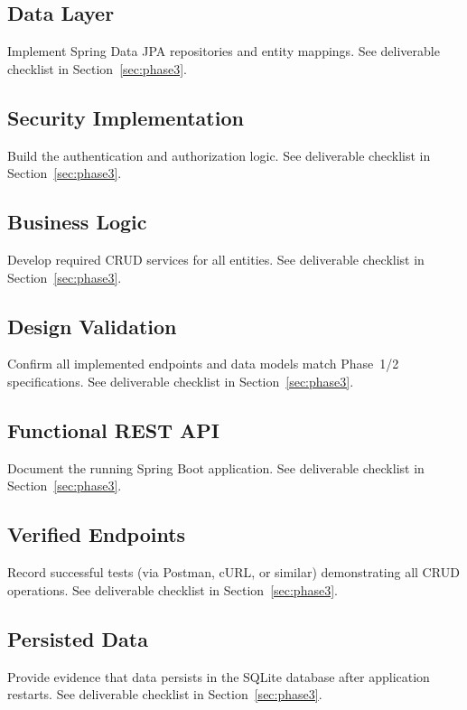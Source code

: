 \subsection{Data Layer}\label{sec:data-layer}
Implement Spring Data JPA repositories and entity mappings.
See deliverable checklist in Section~\ref{sec:phase3}.

\subsection{Security Implementation}\label{sec:security-impl}
Build the authentication and authorization logic.
See deliverable checklist in Section~\ref{sec:phase3}.

\subsection{Business Logic}\label{sec:business-logic}
Develop required CRUD services for all entities.
See deliverable checklist in Section~\ref{sec:phase3}.

\subsection{Design Validation}\label{sec:be-design-validation}
Confirm all implemented endpoints and data models match Phase~1/2 specifications.
See deliverable checklist in Section~\ref{sec:phase3}.

\subsection{Functional REST API}\label{sec:functional-api}
Document the running Spring Boot application.
See deliverable checklist in Section~\ref{sec:phase3}.

\subsection{Verified Endpoints}\label{sec:verified-endpoints}
Record successful tests (via Postman, cURL, or similar) demonstrating all CRUD operations.
See deliverable checklist in Section~\ref{sec:phase3}.

\subsection{Persisted Data}\label{sec:persisted-data}
Provide evidence that data persists in the SQLite database after application restarts.
See deliverable checklist in Section~\ref{sec:phase3}.
